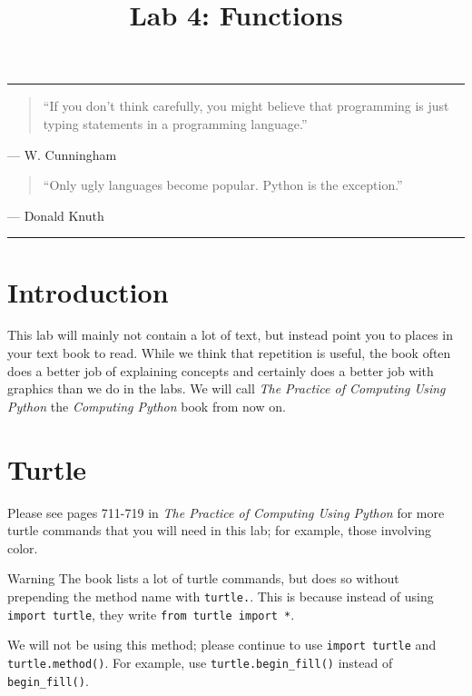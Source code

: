 \documentclass[11pt]{cselabheader}
\title{Lab 4: Functions}
\begin{document}
\maketitle

\hrule
\begin{quotation}
  ``If you don't think carefully, you might believe that programming is just
  typing statements in a programming language.''
\end{quotation}
\begin{flushright}
  --- W. Cunningham
\end{flushright}

\begin{quotation}
  ``Only ugly languages become popular. Python is the exception.''
\end{quotation}
\begin{flushright}
  --- Donald Knuth
\end{flushright}

\hrule

\section{Introduction}

This lab will mainly not contain a lot of text, but instead point you to places
in your text book to read. While we think that repetition is useful, the book
often does a better job of explaining concepts and certainly does a better job
with graphics than we do in the labs. We will call \emph{The Practice of
  Computing Using Python} the \emph{Computing Python} book from now on.

\section{Turtle}

Please see pages 711-719 in \emph{The Practice of Computing Using Python} for
more turtle commands that you will need in this lab; for example, those
involving color.

\begin{warningbox}{Warning}
  The book lists a lot of turtle commands, but does so without prepending the
  method name with \lstinline!turtle.!. This is because instead of using
  \lstinline!import turtle!, they write \lstinline!from turtle import *!. 

  We will not be using this method; please continue to use 
  \lstinline!import turtle! and \lstinline!turtle.method()!. For example, use 
  \lstinline!turtle.begin_fill()! instead of \lstinline!begin_fill()!.
\end{warningbox}
\end{document}
